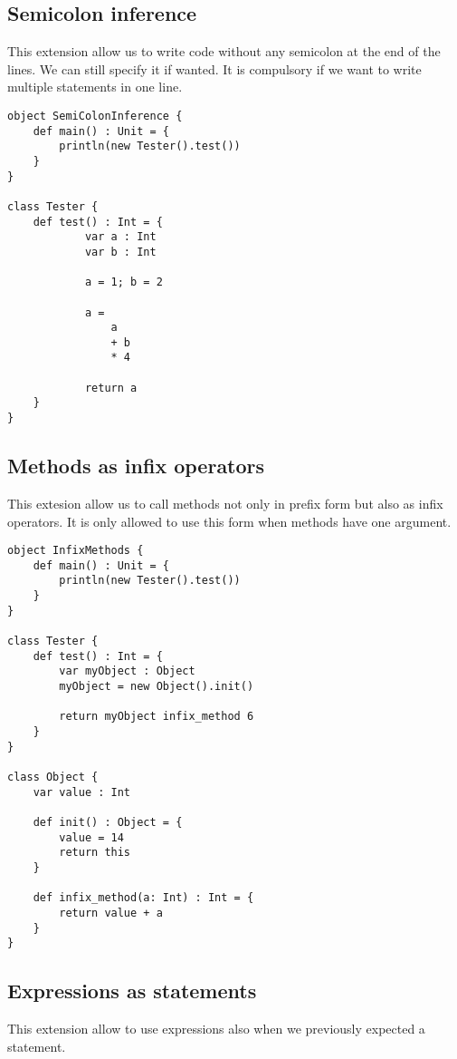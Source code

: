 \subsection{Semicolon inference}

This extension allow us to write code without any semicolon at the end of the lines. We can still specify it if wanted. It is compulsory if we want to write multiple statements in one line.

\begin{lstlisting}
object SemiColonInference {
    def main() : Unit = {
        println(new Tester().test())
    }
}

class Tester {
    def test() : Int = {
			var a : Int
			var b : Int

			a = 1; b = 2

			a =
				a
				+ b
				* 4

			return a
    }
}
\end{lstlisting}

\subsection{Methods as infix operators}

This extesion allow us to call methods not only in prefix form but also as infix operators. It is only allowed to use this form when methods have one argument.

\begin{lstlisting}
object InfixMethods {
    def main() : Unit = {
        println(new Tester().test())
    }
}

class Tester {
    def test() : Int = {
		var myObject : Object
		myObject = new Object().init()

		return myObject infix_method 6
    }
}

class Object {
	var value : Int

	def init() : Object = {
		value = 14
		return this
	}

	def infix_method(a: Int) : Int = {
		return value + a
	}
}
\end{lstlisting}

\subsection{Expressions as statements}

This extension allow to use expressions also when we previously expected a statement.

\begin{lstlisting}

\end{lstlisting}

